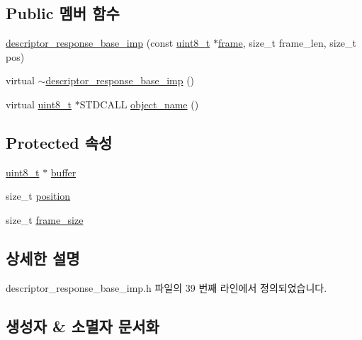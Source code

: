 \subsection*{Public 멤버 함수}
\begin{DoxyCompactItemize}
\item 
\hyperlink{classavdecc__lib_1_1descriptor__response__base__imp_aa0e141f3841a15351ed63602ca2e6291}{descriptor\+\_\+response\+\_\+base\+\_\+imp} (const \hyperlink{stdint_8h_aba7bc1797add20fe3efdf37ced1182c5}{uint8\+\_\+t} $\ast$\hyperlink{gst__avb__playbin_8c_ac8e710e0b5e994c0545d75d69868c6f0}{frame}, size\+\_\+t frame\+\_\+len, size\+\_\+t pos)
\item 
virtual \hyperlink{classavdecc__lib_1_1descriptor__response__base__imp_adc391a634334fb76be66ac47d586300a}{$\sim$descriptor\+\_\+response\+\_\+base\+\_\+imp} ()
\item 
virtual \hyperlink{stdint_8h_aba7bc1797add20fe3efdf37ced1182c5}{uint8\+\_\+t} $\ast$S\+T\+D\+C\+A\+LL \hyperlink{classavdecc__lib_1_1descriptor__response__base__imp_a15837e3eb254ad44812cb766ae8cd53c}{object\+\_\+name} ()
\end{DoxyCompactItemize}
\subsection*{Protected 속성}
\begin{DoxyCompactItemize}
\item 
\hyperlink{stdint_8h_aba7bc1797add20fe3efdf37ced1182c5}{uint8\+\_\+t} $\ast$ \hyperlink{classavdecc__lib_1_1descriptor__response__base__imp_a56ed84df35de10bdb65e72b184309497}{buffer}
\item 
size\+\_\+t \hyperlink{classavdecc__lib_1_1descriptor__response__base__imp_a7a04afe5347934be732ec70a70bd0a28}{position}
\item 
size\+\_\+t \hyperlink{classavdecc__lib_1_1descriptor__response__base__imp_affd041a595cabab98275245b9cb2824d}{frame\+\_\+size}
\end{DoxyCompactItemize}


\subsection{상세한 설명}


descriptor\+\_\+response\+\_\+base\+\_\+imp.\+h 파일의 39 번째 라인에서 정의되었습니다.



\subsection{생성자 \& 소멸자 문서화}
